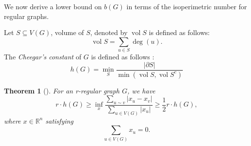 \documentclass[12pt]{article}
\newtheorem{theorem}{Theorem}[section]
\newtheorem{cor}{Corollary}[section]
\DeclareMathOperator{\vol}{vol}
\DeclareMathOperator{\iso}{iso}
\begin{document}






We now derive a lower bound on $b(G)$ in terms of the isoperimetric number for regular graphs.

Let $S \subseteq V(G)$, volume of $S$, denoted by  $\vol S$ is defined as follows: 
$$
\vol  S= \sum_{u \in S }\deg(u).
$$
The \textit{Cheegar's constant} of $G$ is defined as follows \cite{chung-book-1997}: $$h(G) =  \min_S \frac{|\partial S|}{\min(\vol S, \vol S^c)}$$



\begin{theorem}[{\cite[Corollary 2.9]{chung-book-1997}}] \label{Cheeger's const bound}
 For an r-regular graph $G$, we have
$$
r\cdot h(G)\geq \inf\limits_x \frac{\sum\limits_{u \sim v} \vert x_u-x_v \vert}{\sum\limits_{u \in V(G)}\vert x_u\vert } \geq \frac{1}{2}r\cdot h(G),
$$ 
where $ x \in \mathbb{R}^n$ satisfying
$$
\sum_{u\in V(G)}x_u=0.
$$
\end{theorem}
\end{document}
